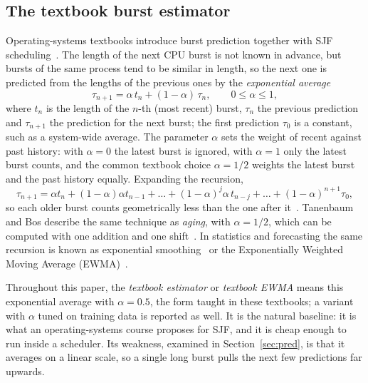 \documentclass[conference,onecolumn,11pt]{IEEEtran}
\begin{document}
\subsection{The textbook burst estimator}\label{sec:textbook}
Operating-systems textbooks introduce burst prediction together with SJF scheduling~\cite{silberschatz2018,tanenbaum2015}. The length of the next CPU burst is not known in advance, but bursts of the same process tend to be similar in length, so the next one is predicted from the lengths of the previous ones by the \emph{exponential average}
\begin{equation}
\tau_{n+1}=\alpha\,t_n+(1-\alpha)\,\tau_n ,\qquad 0\le\alpha\le1,
\end{equation}
where $t_n$ is the length of the $n$-th (most recent) burst, $\tau_n$ the previous prediction and $\tau_{n+1}$ the prediction for the next burst; the first prediction $\tau_0$ is a constant, such as a system-wide average. The parameter $\alpha$ sets the weight of recent against past history: with $\alpha=0$ the latest burst is ignored, with $\alpha=1$ only the latest burst counts, and the common textbook choice $\alpha=1/2$ weights the latest burst and the past history equally. Expanding the recursion,
\begin{equation}
\tau_{n+1}=\alpha t_n+(1-\alpha)\alpha t_{n-1}+\dots+(1-\alpha)^{j}\alpha\, t_{n-j}+\dots+(1-\alpha)^{n+1}\tau_0 ,
\end{equation}
so each older burst counts geometrically less than the one after it~\cite{silberschatz2018}. Tanenbaum and Bos describe the same technique as \emph{aging}, with $\alpha=1/2$, which can be computed with one addition and one shift~\cite{tanenbaum2015}. In statistics and forecasting the same recursion is known as exponential smoothing~\cite{brown1959} or the Exponentially Weighted Moving Average (EWMA)~\cite{roberts1959}.

Throughout this paper, the \emph{textbook estimator} or \emph{textbook EWMA} means this exponential average with $\alpha=0.5$, the form taught in these textbooks; a variant with $\alpha$ tuned on training data is reported as well. It is the natural baseline: it is what an operating-systems course proposes for SJF, and it is cheap enough to run inside a scheduler. Its weakness, examined in Section~\ref{sec:pred}, is that it averages on a linear scale, so a single long burst pulls the next few predictions far upwards.
\end{document}
